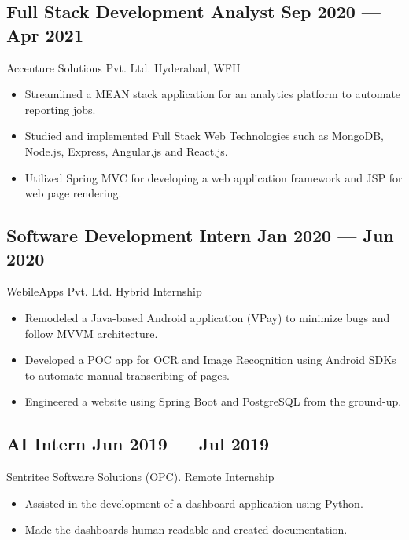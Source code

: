 \documentclass[a4,10pt]{article}
\newcommand{\subtext}[1]{
#1\par\vspace{-0.2cm}}
\newenvironment{zitemize}{
\begin{itemize}\itemsep0pt \parskip0pt \parsep1pt}
{\end{itemize}\vspace{-0.5cm}}
\begin{document}
\subsection*{Full Stack Development Analyst \hfill Sep 2020 --- Apr 2021} 
\subtext{Accenture Solutions Pvt. Ltd. \hfill Hyderabad, WFH} 
    \begin{zitemize}
        \item Streamlined a MEAN stack application for an analytics platform to automate reporting jobs.
        \item Studied and implemented Full Stack Web Technologies such as MongoDB, Node.js, Express, Angular.js and React.js.
        \item Utilized Spring MVC for developing a web application framework and JSP for web page rendering.
    \end{zitemize}
    
\subsection*{Software Development Intern \hfill Jan 2020 --- Jun 2020} 
\subtext{WebileApps Pvt. Ltd. \hfill Hybrid Internship} 
    \begin{zitemize}
        \item Remodeled a Java-based Android application (VPay) to minimize bugs and follow MVVM architecture.
        \item Developed a POC app for OCR and Image Recognition using Android SDKs to automate manual transcribing of pages.
        \item Engineered a website using Spring Boot and PostgreSQL from the ground-up.
    \end{zitemize}


\subsection*{AI Intern \hfill Jun 2019 --- Jul 2019} 
\subtext{Sentritec Software Solutions (OPC). \hfill Remote Internship} 
    \begin{zitemize}
        \item Assisted in the development of a dashboard application using Python.
        \item Made the dashboards human-readable and created documentation.
    \end{zitemize}
\end{document}

